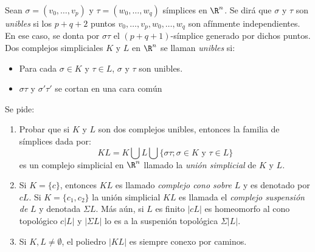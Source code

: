 \documentclass[twoside]{article}
\begin{document}
\begin{ejercicio}{1.2}
Sean $σ = (v_0,\dots,v_p)$ y $τ = (w_0,\dots,w_q)$ símplices en $\R^n$.
Se dirá que $σ$ y $τ$ son \emph{unibles} si los $p+q+2$ puntos $v_0,\dots,v_p,w_0,\dots,w_q$ son afínmente independientes.
En ese caso, se donta por $στ$ el $(p+q+1)$-símplice generado por dichos puntos.
Dos complejos simpliciales $K$ y $L$ en $\R^n$ se llaman \emph{unibles} si:
\begin{itemize}
\item Para cada $σ \in K$ y $τ \in L$, $σ$ y $τ$ son unibles.
\item $στ$ y $σ'τ'$ se cortan en una cara común
\end{itemize}
Se pide:
\begin{enumerate}
\item Probar que si $K$ y $L$ son dos complejos unibles, entonces la familia de símplices dada por:
\[ KL = K \bigcup L \bigcup \{στ; σ \in K \text{ y }τ \in L\} \]
es un complejo simplicial en $\R^n$ llamado la \emph{unión simplicial} de $K$ y $L$.
\item Si $K = \{c\}$, entonces $KL$ es llamado \emph{complejo cono sobre} $L$ y es denotado por $cL$.
Si $K = \{c_1,c_2\}$ la unión simplicial $KL$ es llamada el \emph{complejo suspensión de} $L$ y denotada $ΣL$.
Más aún, si $L$ es finito $|cL|$ es homeomorfo al cono topológico $c|L|$ y $|ΣL|$ lo es a la suspenión topológica $Σ|L|$.
\item Si $K, L \neq \emptyset$, el poliedro $|KL|$ es siempre conexo por caminos.
\end{enumerate}
\end{ejercicio}
\end{document}
